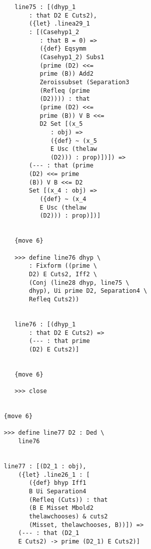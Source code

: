 \documentclass[12pt]{article}
\begin{document}
\begin{verbatim}
                     line75 : [(dhyp_1 
                         : that D2 E Cuts2), 
                         ({let} .linea29_1 
                         : [(Casehyp1_2 
                            : that B = 0) => 
                            ({def} Eqsymm 
                            (Casehyp1_2) Subs1 
                            (prime (D2) <<= 
                            prime (B)) Add2 
                            Zeroissubset (Separation3 
                            (Refleq (prime 
                            (D2)))) : that 
                            (prime (D2) <<= 
                            prime (B)) V B <<= 
                            D2 Set [(x_5 
                               : obj) => 
                               ({def} ~ (x_5 
                               E Usc (thelaw 
                               (D2))) : prop)])]) => 
                         (--- : that (prime 
                         (D2) <<= prime 
                         (B)) V B <<= D2 
                         Set [(x_4 : obj) => 
                            ({def} ~ (x_4 
                            E Usc (thelaw 
                            (D2))) : prop)])]


                     {move 6}

                     >>> define line76 dhyp \
                         : Fixform ((prime \
                         D2) E Cuts2, Iff2 \
                         (Conj (line28 dhyp, line75 \
                         dhyp), Ui prime D2, Separation4 \
                         Refleq Cuts2))


                     line76 : [(dhyp_1 
                         : that D2 E Cuts2) => 
                         (--- : that prime 
                         (D2) E Cuts2)]


                     {move 6}

                     >>> close


                  {move 6}

                  >>> define line77 D2 : Ded \
                      line76


                  line77 : [(D2_1 : obj), 
                      ({let} .line26_1 : [
                         ({def} bhyp Iff1 
                         B Ui Separation4 
                         (Refleq (Cuts)) : that 
                         (B E Misset Mbold2 
                         thelawchooses) & cuts2 
                         (Misset, thelawchooses, B))]) => 
                      (--- : that (D2_1 
                      E Cuts2) -> prime (D2_1) E Cuts2)]



\end{verbatim}
\end{document}

